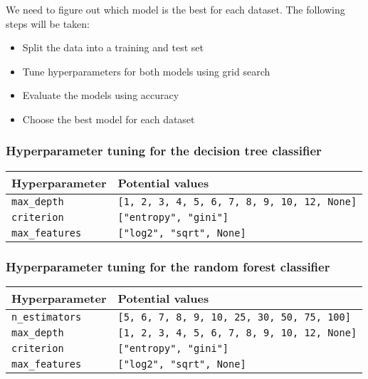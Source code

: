 \documentclass[11pt]{article}
\begin{document}
We need to figure out which model is the best for each dataset. The
following steps will be taken:

\begin{itemize}
\item
  Split the data into a training and test set
\item
  Tune hyperparameters for both models using grid search
\item
  Evaluate the models using accuracy
\item
  Choose the best model for each dataset
\end{itemize}

\subsubsection{Hyperparameter tuning for the decision tree
classifier}\label{hyperparameter-tuning-for-the-decision-tree-classifier}

\begin{longtable}[]{@{}ll@{}}
\toprule\noalign{}
Hyperparameter & Potential values \\
\midrule\noalign{}
\endhead
\bottomrule\noalign{}
\endlastfoot
\texttt{max\_depth} &
\texttt{{[}1,\ 2,\ 3,\ 4,\ 5,\ 6,\ 7,\ 8,\ 9,\ 10,\ 12,\ None{]}} \\
\texttt{criterion} & \texttt{{[}"entropy",\ "gini"{]}} \\
\texttt{max\_features} & \texttt{{[}"log2",\ "sqrt",\ None{]}} \\
\end{longtable}

\subsubsection{Hyperparameter tuning for the random forest
classifier}\label{hyperparameter-tuning-for-the-random-forest-classifier}

\begin{longtable}[]{@{}ll@{}}
\toprule\noalign{}
Hyperparameter & Potential values \\
\midrule\noalign{}
\endhead
\bottomrule\noalign{}
\endlastfoot
\texttt{n\_estimators} &
\texttt{{[}5,\ 6,\ 7,\ 8,\ 9,\ 10,\ 25,\ 30,\ 50,\ 75,\ 100{]}} \\
\texttt{max\_depth} &
\texttt{{[}1,\ 2,\ 3,\ 4,\ 5,\ 6,\ 7,\ 8,\ 9,\ 10,\ 12,\ None{]}} \\
\texttt{criterion} & \texttt{{[}"entropy",\ "gini"{]}} \\
\texttt{max\_features} & \texttt{{[}"log2",\ "sqrt",\ None{]}} \\
\end{longtable}
\end{document}
